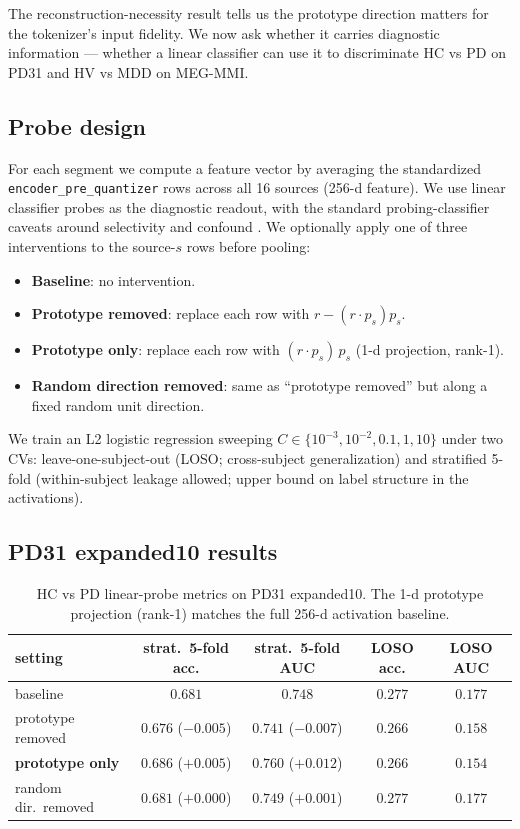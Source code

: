 \documentclass[11pt]{article}
\begin{document}
The reconstruction-necessity result tells us the prototype direction matters
for the tokenizer's input fidelity. We now ask whether it carries diagnostic
information --- whether a linear classifier can use it to discriminate HC vs
PD on PD31 and HV vs MDD on MEG-MMI.

\subsection{Probe design}

For each segment we compute a feature vector by averaging the standardized
\texttt{encoder\_pre\_quantizer} rows across all 16 sources (256-d feature).
We use linear classifier probes \cite{alain2017probes} as the
diagnostic readout, with the standard probing-classifier caveats around
selectivity and confound \cite{belinkov2022probing,hewitt2019probes}.
We optionally apply one of three interventions to the source-$s$ rows
before pooling:
\begin{itemize}
\item \textbf{Baseline}: no intervention.
\item \textbf{Prototype removed}: replace each row with $r - (r \cdot p_s)p_s$.
\item \textbf{Prototype only}: replace each row with $(r \cdot p_s)\,p_s$
(1-d projection, rank-1).
\item \textbf{Random direction removed}: same as ``prototype removed'' but
along a fixed random unit direction.
\end{itemize}
We train an L2 logistic regression sweeping
$C \in \{10^{-3}, 10^{-2}, 0.1, 1, 10\}$ under two CVs:
leave-one-subject-out (LOSO; cross-subject generalization) and stratified
5-fold (within-subject leakage allowed; upper bound on label structure in the
activations).

\subsection{PD31 expanded10 results}

\begin{table}[h]
\centering
\small
\begin{tabular}{lcccc}
\toprule
\textbf{setting} & \textbf{strat.\ 5-fold acc.} & \textbf{strat.\ 5-fold AUC} & \textbf{LOSO acc.} & \textbf{LOSO AUC} \\
\midrule
baseline                 & $0.681$ & $0.748$           & $0.277$ & $0.177$ \\
prototype removed        & $0.676$ ($-0.005$) & $0.741$ ($-0.007$) & $0.266$ & $0.158$ \\
\textbf{prototype only}  & $\mathbf{0.686}$ ($+0.005$) & $\mathbf{0.760}$ ($+0.012$) & $0.266$ & $0.154$ \\
random dir.\ removed     & $0.681$ ($+0.000$) & $0.749$ ($+0.001$) & $0.277$ & $0.177$ \\
\bottomrule
\end{tabular}
\caption{HC vs PD linear-probe metrics on PD31 expanded10. The 1-d prototype
projection (rank-1) matches the full 256-d activation baseline.
\label{tab:pd31-probe}}
\end{table}
\end{document}

